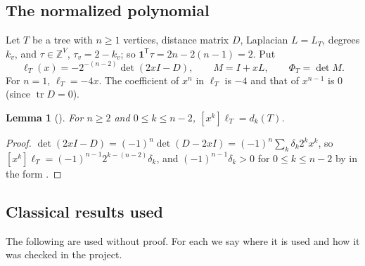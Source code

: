 \documentclass[11pt]{amsart}
\newtheorem{lemma}[theorem]{Lemma}
\theoremstyle{definition}
\theoremstyle{remark}
\newcommand{\tr}{\operatorname{tr}}
\newcommand{\one}{\mathbf 1}
\newcommand{\T}{\mathsf T}
\begin{document}
\subsection{The normalized polynomial}
Let $T$ be a tree with $n\ge1$ vertices, distance matrix $D$, Laplacian
$L=L_T$, degrees $k_v$, and $\tau\in\mathbb Z^V$, $\tau_v=2-k_v$; so
$\one^\T\tau=2n-2(n-1)=2$. Put
\[
\ell_T(x)=-2^{-(n-2)}\det(2xI-D),\qquad M=I+xL,\qquad \Phi_T=\det M .
\]
For $n=1$, $\ell_T=-4x$. The coefficient of $x^n$ in $\ell_T$ is $-4$ and that
of $x^{n-1}$ is $0$ (since $\tr D=0$).

\begin{lemma}[{\cite[Observation~3.1]{AAB}}]\label{lem:ident}
For $n\ge2$ and $0\le k\le n-2$, $[x^k]\ell_T=d_k(T)$.
\end{lemma}

\begin{proof}
$\det(2xI-D)=(-1)^n\det(D-2xI)=(-1)^n\sum_k\delta_k2^kx^k$, so
$[x^k]\ell_T=(-1)^{n-1}2^{k-(n-2)}\delta_k$, and $(-1)^{n-1}\delta_k>0$ for
$0\le k\le n-2$ by \cite{GL78} in the form \cite[Fact~1.1]{AAB}.
\end{proof}

\subsection{Classical results used}\label{sec:tools}
The following are used without proof. For each we say where it is used and
how it was checked in the project.
\end{document}
